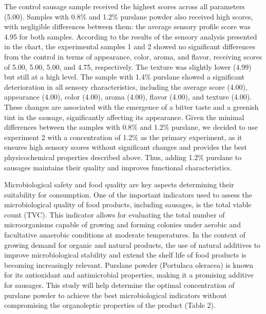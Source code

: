 \begin{multicols}{2}

The control sausage sample received the highest scores across all
parameters (5.00). Samples with 0.8\% and 1.2\% purslane powder also
received high scores, with negligible differences between them: the
average sensory profile score was 4.95 for both samples. According to
the results of the sensory analysis presented in the chart, the
experimental samples 1 and 2 showed no significant differences from the
control in terms of appearance, color, aroma, and flavor, receiving
scores of 5.00, 5.00, 5.00, and 4.75, respectively. The texture was
slightly lower (4.99) but still at a high level. The sample with 1.4\%
purslane showed a significant deterioration in all sensory
characteristics, including the average score (4.00), appearance (4.00),
color (4.00), aroma (4.00), flavor (4.00), and texture (4.00). These
changes are associated with the emergence of a bitter taste and a
greenish tint in the sausage, significantly affecting its appearance.
Given the minimal differences between the samples with 0.8\% and 1.2\%
purslane, we decided to use experiment 2 with a concentration of 1.2\%
as the primary experiment, as it ensures high sensory scores without
significant changes and provides the best physicochemical properties
described above. Thus, adding 1.2\% purslane to sausages maintains their
quality and improves functional characteristics.

Microbiological safety and food quality are key aspects determining
their suitability for consumption. One of the important indicators used
to assess the microbiological quality of food products, including
sausages, is the total viable count (TVC). This indicator allows for
evaluating the total number of microorganisms capable of growing and
forming colonies under aerobic and facultative anaerobic conditions at
moderate temperatures. In the context of growing demand for organic and
natural products, the use of natural additives to improve
microbiological stability and extend the shelf life of food products is
becoming increasingly relevant. Purslane powder (Portulaca oleracea) is
known for its antioxidant and antimicrobial properties, making it a
promising additive for sausages. This study will help determine the
optimal concentration of purslane powder to achieve the best
microbiological indicators without compromising the organoleptic
properties of the product (Table 2).
\end{multicols}


